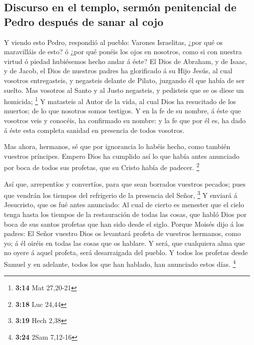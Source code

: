 \hypertarget{discurso-en-el-templo-sermuxf3n-penitencial-de-pedro-despuuxe9s-de-sanar-al-cojo}{%
\subsection{Discurso en el templo, sermón penitencial de Pedro después
de sanar al
cojo}\label{discurso-en-el-templo-sermuxf3n-penitencial-de-pedro-despuuxe9s-de-sanar-al-cojo}}

 Y viendo esto Pedro, respondió al pueblo: Varones
Israelitas, ¿por qué os maravilláis de esto? ó ¿por qué ponéis los ojos
en nosotros, como si con nuestra virtud ó piedad hubiésemos hecho andar
á éste?  El Dios de Abraham, y de Isaac, y de Jacob, el
Dios de nuestros padres ha glorificado á su Hijo Jesús, al cual vosotros
entregasteis, y negasteis delante de Pilato, juzgando él que había de
ser suelto.  Mas vosotros al Santo y al Justo negasteis, y
pedisteis que se os diese un homicida; \footnote{\textbf{3:14} Mat
  27,20-21}  Y matasteis al Autor de la vida, al cual Dios
ha resucitado de los muertos; de lo que nosotros somos testigos.
 Y en la fe de su nombre, á éste que vosotros veis y
conocéis, ha confirmado su nombre: y la fe que por él es, ha dado á éste
esta completa sanidad en presencia de todos vosotros.

 Mas ahora, hermanos, sé que por ignorancia lo habéis
hecho, como también vuestros príncipes.  Empero Dios ha
cumplido así lo que había antes anunciado por boca de todos sus
profetas, que su Cristo había de padecer. \footnote{\textbf{3:18} Luc
  24,44}

 Así que, arrepentíos y convertíos, para que sean borrados
vuestros pecados; pues que vendrán los tiempos del refrigerio de la
presencia del Señor, \footnote{\textbf{3:19} Hech 2,38}  Y
enviará á Jesucristo, que os fué antes anunciado:  Al cual
de cierto es menester que el cielo tenga hasta los tiempos de la
restauración de todas las cosas, que habló Dios por boca de sus santos
profetas que han sido desde el siglo.  Porque Moisés dijo á
los padres: El Señor vuestro Dios os levantará profeta de vuestros
hermanos, como yo; á él oiréis en todas las cosas que os hablare.
 Y será, que cualquiera alma que no oyere á aquel profeta,
será desarraigada del pueblo.  Y todos los profetas desde
Samuel y en adelante, todos los que han hablado, han anunciado estos
días. \footnote{\textbf{3:24} 2Sam 7,12-16}

